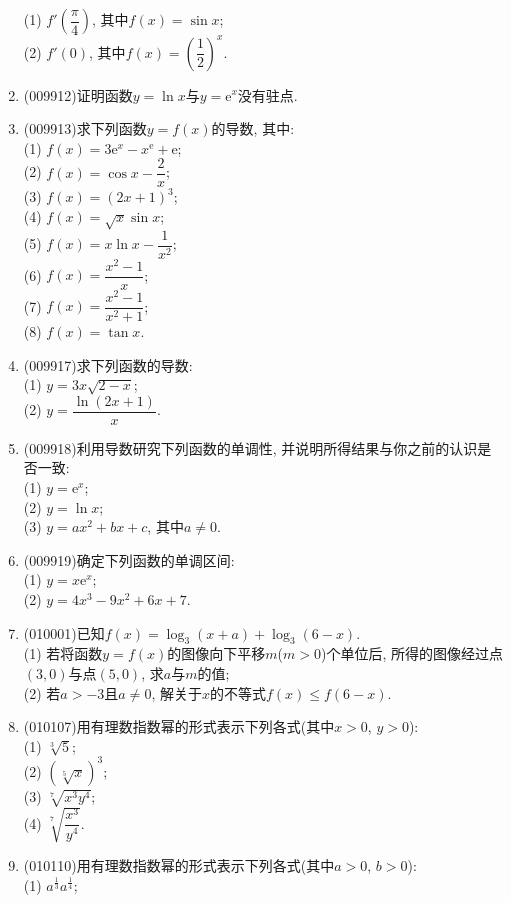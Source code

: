 \documentclass[10pt,a4paper]{article}
\begin{document}
\begin{enumerate}[1.]
(1) $f'(\dfrac\pi 4)$, 其中$f(x)=\sin x$;\\
(2) $f'(0)$, 其中$f(x)=(\dfrac 12)^x$.
\item {\tiny (009912)}证明函数$y=\ln x$与$y=\mathrm{e}^x$没有驻点.
\item {\tiny (009913)}求下列函数$y=f(x)$的导数, 其中:\\
(1) $f(x)=3\mathrm{e}^x-x^{\mathrm{e}}+\mathrm{e}$;\\
(2) $f(x)=\cos x-\dfrac 2x$;\\
(3) $f(x)=(2x+1)^3$;\\
(4) $f(x)=\sqrt x\sin x$;\\
(5) $f(x)=x\ln x-\dfrac1{x^2}$;\\
(6) $f(x)=\dfrac{x^2-1}x$;\\
(7) $f(x)=\dfrac{x^2-1}{x^2+1}$;\\
(8) $f(x)=\tan x$.
\item {\tiny (009917)}求下列函数的导数:\\
(1) $y=3x \sqrt{2-x}$;\\
(2) $y=\dfrac{\ln(2x+1)}x$.
\item {\tiny (009918)}利用导数研究下列函数的单调性, 并说明所得结果与你之前的认识是否一致:\\
(1) $y=\mathrm{e}^x$;\\
(2) $y=\ln x$;\\
(3) $y=ax^2+bx+c$, 其中$a\ne 0$.
\item {\tiny (009919)}确定下列函数的单调区间:\\
(1) $y=x\mathrm{e}^x$;\\
(2) $y=4x^3-9x^2+6x+7$.
\item {\tiny (010001)}已知$f(x)=\log_3(x+a)+\log_3(6-x)$.\\
(1) 若将函数$y=f(x)$的图像向下平移$m$($m>0$)个单位后, 所得的图像经过点$(3,0)$与点$(5,0)$, 求$a$与$m$的值;\\
(2) 若$a>-3$且$a\ne 0$, 解关于$x$的不等式$f(x)\le f(6-x)$.
\item {\tiny (010107)}用有理数指数幂的形式表示下列各式(其中$x>0$, $y>0$):\\
(1) $\sqrt[3]{5}$;\\
(2) $(\sqrt[5]{x})^3$;\\
(3) $\sqrt[7]{x^3y^4}$;\\
(4) $\sqrt[7]{\dfrac{x^3}{y^4}}$.
\item {\tiny (010110)}用有理数指数幂的形式表示下列各式(其中$a>0$, $b>0$):\\
(1) $a^\frac 13a^\frac 14$;\\

\end{enumerate}
\end{document}
